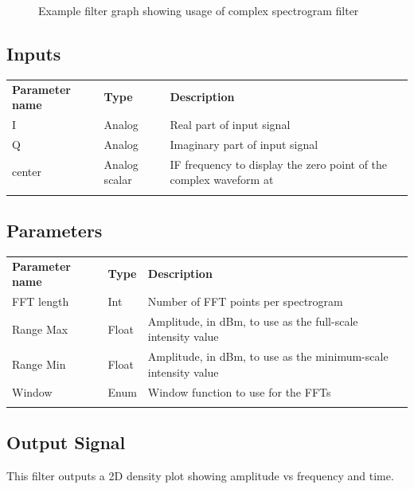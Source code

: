 \begin{figure}[h]
\centering
{}
\caption{Example filter graph showing usage of complex spectrogram filter}
\label{filter_complexspectrogram_graph}
\end{figure}

\FloatBarrier

\subsection{Inputs}

\begin{tabularx}{16cm}{llX}
\thickhline
\textbf{Parameter name} & \textbf{Type} & \textbf{Description} \\
\thickhline
I & Analog & Real part of input signal\\
\thinhline
Q & Analog & Imaginary part of input signal\\
\thinhline
center & Analog scalar & IF frequency to display the zero point of the complex waveform at\\
\thickhline
\end{tabularx}

\subsection{Parameters}

\begin{tabularx}{16cm}{llX}
\thickhline
\textbf{Parameter name} & \textbf{Type} & \textbf{Description} \\
\thickhline
FFT length & Int & Number of FFT points per spectrogram\\
\thinhline
Range Max & Float & Amplitude, in dBm, to use as the full-scale intensity value\\
\thinhline
Range Min & Float & Amplitude, in dBm, to use as the minimum-scale intensity value\\
\thinhline
Window & Enum & Window function to use for the FFTs\\
\thickhline
\end{tabularx}

\subsection{Output Signal}

This filter outputs a 2D density plot showing amplitude vs frequency and time.

\pagebreak
